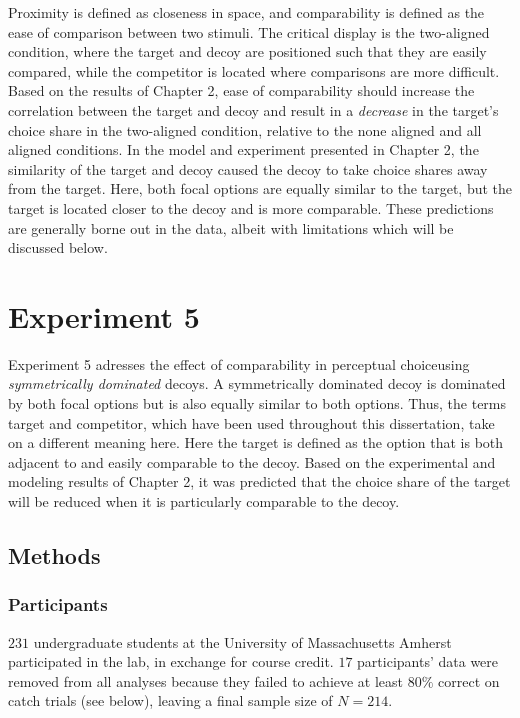 Proximity is defined as closeness in space, and comparability is defined as the ease of comparison between two stimuli. The critical display is the two-aligned condition, where the target and decoy are positioned such that they are easily compared, while the competitor is located where comparisons are more difficult. Based on the results of Chapter 2, ease of comparability should increase the correlation between the target and decoy and result in a \textit{decrease} in the target's choice share in the two-aligned condition, relative to the none aligned and all aligned conditions. In the model and experiment presented in Chapter 2, the similarity of the target and decoy caused the decoy to take choice shares away from the target. Here, both focal options are equally similar to the target, but the target is located closer to the decoy and is more comparable. These predictions are generally borne out in the data, albeit with limitations which will be discussed below.

\section{Experiment 5}
Experiment 5 adresses the effect of comparability in perceptual choiceusing \textit{symmetrically dominated} decoys. A symmetrically dominated decoy is dominated by both focal options but is also equally similar to both options. Thus, the terms target and competitor, which have been used throughout this dissertation, take on a different meaning here. Here the target is defined as the option that is both adjacent to and easily comparable to the decoy. Based on the experimental and modeling results of Chapter 2, it was predicted that the choice share of the target will be reduced when it is particularly comparable to the decoy.

\subsection{Methods}

\subsubsection{Participants}
$231$ undergraduate students at the University of Massachusetts Amherst participated in the lab, in exchange for course credit. $17$ participants' data were removed from all analyses because they failed to achieve at least $80\%$ correct on catch trials (see below), leaving a final sample size of $N=214$. 

